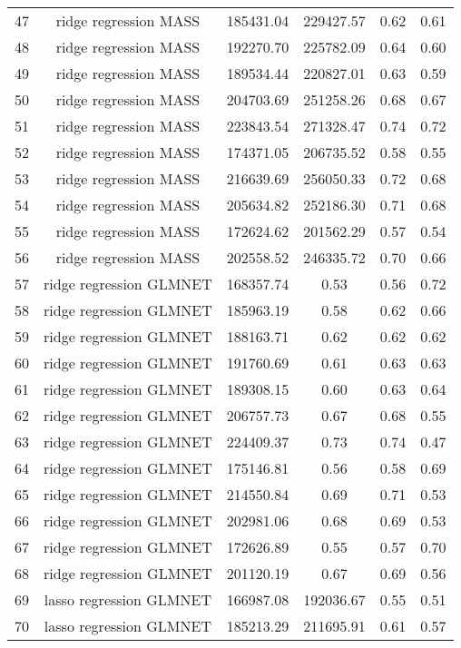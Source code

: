 \begin{tabular}{cccccc}
  47 & ridge regression MASS & 185431.04 & 229427.57 & 0.62 & 0.61 \\ 
  48 & ridge regression MASS & 192270.70 & 225782.09 & 0.64 & 0.60 \\ 
  49 & ridge regression MASS & 189534.44 & 220827.01 & 0.63 & 0.59 \\ 
  50 & ridge regression MASS & 204703.69 & 251258.26 & 0.68 & 0.67 \\ 
  51 & ridge regression MASS & 223843.54 & 271328.47 & 0.74 & 0.72 \\ 
  52 & ridge regression MASS & 174371.05 & 206735.52 & 0.58 & 0.55 \\ 
  53 & ridge regression MASS & 216639.69 & 256050.33 & 0.72 & 0.68 \\ 
  54 & ridge regression MASS & 205634.82 & 252186.30 & 0.71 & 0.68 \\ 
  55 & ridge regression MASS & 172624.62 & 201562.29 & 0.57 & 0.54 \\ 
  56 & ridge regression MASS & 202558.52 & 246335.72 & 0.70 & 0.66 \\ 
  57 & ridge regression GLMNET & 168357.74 & 0.53 & 0.56 & 0.72 \\ 
  58 & ridge regression GLMNET & 185963.19 & 0.58 & 0.62 & 0.66 \\ 
  59 & ridge regression GLMNET & 188163.71 & 0.62 & 0.62 & 0.62 \\ 
  60 & ridge regression GLMNET & 191760.69 & 0.61 & 0.63 & 0.63 \\ 
  61 & ridge regression GLMNET & 189308.15 & 0.60 & 0.63 & 0.64 \\ 
  62 & ridge regression GLMNET & 206757.73 & 0.67 & 0.68 & 0.55 \\ 
  63 & ridge regression GLMNET & 224409.37 & 0.73 & 0.74 & 0.47 \\ 
  64 & ridge regression GLMNET & 175146.81 & 0.56 & 0.58 & 0.69 \\ 
  65 & ridge regression GLMNET & 214550.84 & 0.69 & 0.71 & 0.53 \\ 
  66 & ridge regression GLMNET & 202981.06 & 0.68 & 0.69 & 0.53 \\ 
  67 & ridge regression GLMNET & 172626.89 & 0.55 & 0.57 & 0.70 \\ 
  68 & ridge regression GLMNET & 201120.19 & 0.67 & 0.69 & 0.56 \\ 
  69 & lasso regression GLMNET & 166987.08 & 192036.67 & 0.55 & 0.51 \\ 
  70 & lasso regression GLMNET & 185213.29 & 211695.91 & 0.61 & 0.57 \\ 

\end{tabular}
